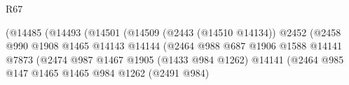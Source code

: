 \begin{lexlean}{R67}
\begin{coremodule}
                                                              (@14485
                                                                (@14493
                                                                  (@14501
                                                                    (@14509
                                                                      (@2443 (@14510 @14134))
                                                                      @2452
                                                                      (@2458
                                                                        @990
                                                                        @1908
                                                                        @1465
                                                                        @14143
                                                                        @14144
                                                                        (@2464
                                                                          @988
                                                                          @687
                                                                          @1906
                                                                          @1588
                                                                          @14141
                                                                          @7873
                                                                          (@2474
                                                                            @987
                                                                            @1467
                                                                            @1905
                                                                            (@1433 @984 @1262)
                                                                            @14141
                                                                            (@2464
                                                                              @985
                                                                              @147
                                                                              @1465
                                                                              @1465
                                                                              @984
                                                                              @1262
                                                                              (@2491 @984)

\end{coremodule}
\end{lexlean}
